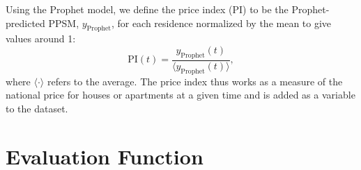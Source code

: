 Using the Prophet model, we define the price index (PI) to be the Prophet-predicted PPSM, $y_\mathrm{Prophet}$, for each residence normalized by the mean to give values around \num{1}:
\begin{equation}
  \mathrm{PI}(t) = \frac{y_\mathrm{Prophet}(t)}{\langle y_\mathrm{Prophet}(t) \rangle},
\end{equation}
where $\langle \boldsymbol{\cdot} \rangle$ refers to the average. The price index thus works as a measure of the national price for houses or apartments at a given time and is added as a variable to the dataset. 


\section{Evaluation Function}
\label{sec:h:evaluation_function}

